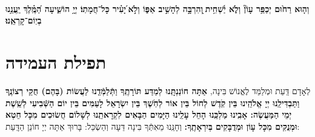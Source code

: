 \documentclass[twoside, openany, parskip=half, 11pt]{book}
\begin{document}
\\
\textbf{וְה֤וּא רַח֙וּם יְכַפֵּ֥ר עָוֹן֘ וְלֹ֢א יַ֫שְׁחִ֥ית ֖וְהִרְבָּ֣ה לְהָשִׁ֣יב אַפּ֑וֹ וְלֹ֣א ֝יָעִ֗יר כָּל־חֲמָתֽוֹ׃ יְיָ֥ הוֹשִׁ֑יעָה הַ֝מֶּֽ֗לֶךְ יַֽעֲנֵ֥נוּ בְיֽוֹם־קָרְאֵֽנוּ׃}

\clearpage

\barachu

\hamaarivaravim

\ahavasolam

\shema

\veahavta

\vehaya

\vayomer

\emesveemuna 

\hashkiveinu 

\boruchhashemleolam 

\yerueinnu

\halfkaddish

 \section[תפילת העמידה]{ תפילת העמידה }
 
\weekdaysaavos

\weekdaysamechayey

\weekdaysakiddushhashem

 לְאָדָם דַּֽעַת וּמְלַמֵּד לֶאֱנוֹשׁ בִּינָה,
 \textbf{
 אַתָּה חוֹנַנְתָּֽנוּ לְמַדַּע תּוֹרָתֶֽךָ וַתְּֿלַמְּֿדֵֽנוּ לַעֲשׂוֹת (בָּהֶם) חֻקֵּי רְצוֹנֶֽךָ וַתַּבְדִּילֵֽנוּ יְיָ אֱלֹהֵֽינוּ בֵּין קֹֽדֶשׁ לְחוֹל בֵּין אוֹר לְחֹֽשֶׁךְ בֵּין יִשְׂרָאֵל לָעַמִּים בֵּין יוֹם הַשְּֿׁבִיעִי לְשֵֽׁשֶׁת יְמֵי הַמַּעֲשֶׂה: אָבִֽינוּ מַלְכֵּֽנוּ הָחֵל עָלֵֽינוּ הַיָּמִים הַבָּאִים לִקְרָאתֵֽנוּ לְשָׁלוֹם חֲשׂוּכִים מִכָּל חֵטְא וּמְנֻקִּים מִכָּל עָוֹן וּמְדֻבָּקִים בְּיִרְאָתֶֽךָ:
}
 וְחָנֵּֽנוּ מֵאִתְּֿךָ בִּינָה דֵּעָה וְהַשְׂכֵּל: בָּרוּךְ אַתָּה יְיָ חוֹנֵן הַדָּֽעַת:

\weekdaysateshuva

\weekdaysaselichah

\weekdaysageulah

\weekdaysarefuah

\weekdaysaberacha

\weekdaysashofar

\weekdaysamishpat

\weekdaysaminim

\weekdaysatzadikim

\weekdaysayerushelayim

\weekdaysamalchus
\end{document}

